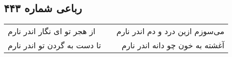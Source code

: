 \begin{center}
\section*{رباعی شماره ۴۴۳}
\label{sec:sh443}
\begin{longtable}{l p{0.5cm} r}
از هجر تو ای نگار اندر نارم
&&
می‌سوزم ازین درد و دم اندر نارم
\\
تا دست به گردن تو اندر نارم
&&
آغشته به خون چو دانه اندر نارم
\\
\end{longtable}
\end{center}
